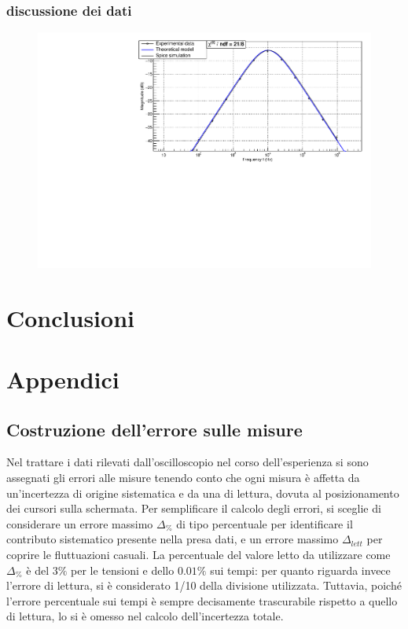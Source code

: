 \documentclass{article}
\begin{document}


\subsubsection{discussione dei dati}

\begin{center}
    \begin{figure}[H]
    \centering
    \includegraphics[scale=0.375, angle=0]{bodeshaper_no_pz.pdf}
    \caption{}
    \label{fig:bodeshaper_no_pz}
    \end{figure}
\end{center}
\section{Conclusioni}

\appendix
\section{Appendici}
\label{appendice}
\subsection{Costruzione dell'errore sulle misure}
\label{Calcerr}

Nel trattare i dati rilevati dall'oscilloscopio nel corso dell'esperienza si sono assegnati gli errori alle misure tenendo conto che ogni misura è affetta da un'incertezza di origine sistematica e da una di lettura, dovuta al posizionamento dei cursori sulla schermata. Per semplificare il calcolo degli errori, si sceglie di considerare un errore massimo $\Delta_{\%}$ di tipo percentuale per identificare il contributo sistematico presente nella presa dati, e un errore massimo $\Delta_{lett}$ per coprire le fluttuazioni casuali. La percentuale del valore letto da utilizzare come $\Delta_{\%}$ è del $3\%$ per le tensioni e dello $0.01\%$ sui tempi: per quanto riguarda invece l'errore di lettura, si è considerato 1/10 della divisione utilizzata.
Tuttavia, poiché l'errore percentuale sui tempi è sempre decisamente trascurabile rispetto a quello di lettura, lo si è omesso nel calcolo dell'incertezza totale.
\end{document}
